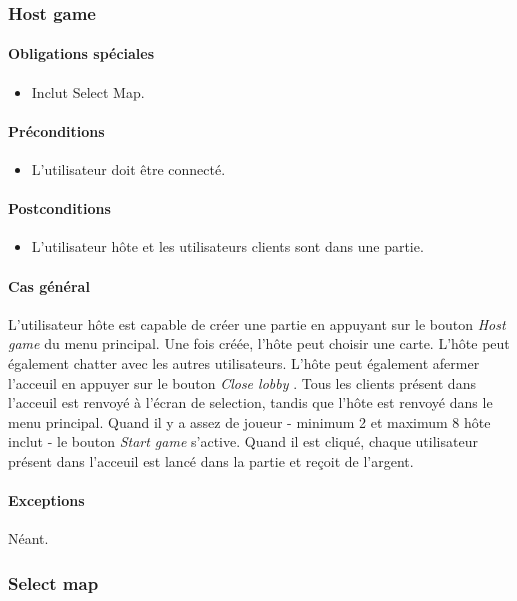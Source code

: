 \documentclass[a4paper,11pt]{report}
\begin{document}
\subsubsection{Host game}
\paragraph{Obligations spéciales}
\begin{itemize}
 \item Inclut Select Map.
\end{itemize}
\paragraph{Préconditions}
\begin{itemize}
 \item L'utilisateur doit être connecté.
\end{itemize}
\paragraph{Postconditions}
\begin{itemize}
 \item L'utilisateur hôte et les utilisateurs clients sont dans une partie.
\end{itemize}
\paragraph{Cas général}
L'utilisateur hôte est capable de créer une partie en appuyant sur le bouton \og \textit{Host game} \fg du menu principal.
Une fois créée, l'hôte peut choisir une carte. L'hôte peut également chatter avec les autres utilisateurs.
L'hôte peut également afermer l'acceuil en appuyer sur le bouton \og \textit{Close lobby} \fg. Tous les clients
présent dans l'acceuil est renvoyé à l'écran de selection, tandis que l'hôte est renvoyé dans le menu principal.
Quand il y a assez de joueur - minimum 2 et maximum 8 hôte inclut - le bouton \og \textit{Start game} \fg s'active.
Quand il est cliqué, chaque utilisateur présent dans l'acceuil est lancé dans la partie et reçoit de l'argent.
\paragraph{Exceptions} Néant.

\newpage
\subsubsection{Select map}
\end{document}

